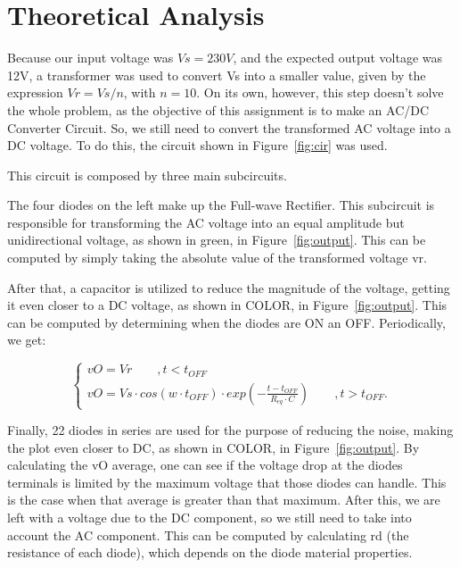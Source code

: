\section{Theoretical Analysis}
\label{sec:analysis}

Because our input voltage was $Vs = 230V$, and the expected output voltage was 12V, a transformer was used to convert Vs into a smaller value, given by the expression $Vr=Vs/n$, with $n=10$. On its own, however, this step doesn't solve the whole problem, as the objective of this assignment is to make an AC/DC Converter Circuit. So, we still need to convert the transformed AC voltage into a DC voltage. To do this, the circuit shown in Figure~\ref{fig:cir} was used.

This circuit is composed by three main subcircuits. 

The four diodes on the left make up the Full-wave Rectifier. This subcircuit is responsible for transforming the AC voltage into an equal amplitude but unidirectional voltage, as shown in green, in Figure~\ref{fig:output}. This can be computed by simply taking the absolute value of the transformed voltage vr. 

After that, a capacitor is utilized to reduce the magnitude of the voltage, getting it even closer to a DC voltage, as shown in COLOR, in Figure~\ref{fig:output}. This can be computed by determining when the diodes are ON an OFF. Periodically, we get:

\begin{equation}
    \begin{cases}
        vO = Vr \qquad , t < t_{OFF} \\
	    vO = Vs \cdot cos(w \cdot t_{OFF}) \cdot exp(-\frac{t-t_{OFF}}{R_{eq} \cdot C}) \qquad , t > t_{OFF}.
    
  \label{eq:vo}  
  \end{cases}
\end{equation}


Finally, 22 diodes in series are used for the purpose of reducing the noise, making the plot even closer to DC, as shown in COLOR, in Figure~\ref{fig:output}. By calculating the vO average, one can see if the voltage drop at the diodes terminals is limited by the maximum voltage that those diodes can handle. This is the case when that average is greater than that maximum. After this, we are left with a voltage due to the DC component, so we still need to take into account the AC component. This can be computed by calculating rd (the resistance of each diode), which depends on the diode material properties.

